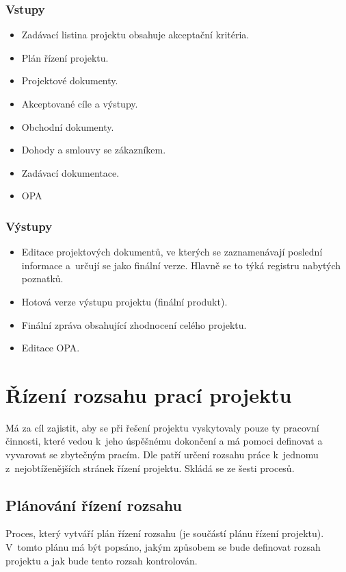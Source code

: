 \subsubsection*{Vstupy}
\begin{itemize}
    \item Zadávací listina projektu obsahuje akceptační kritéria.
    \item Plán řízení projektu.
    \item Projektové dokumenty.
    \item Akceptované cíle a výstupy.
    \item Obchodní dokumenty.
    \item Dohody a smlouvy se zákazníkem.
    \item Zadávací dokumentace.
    \item OPA
\end{itemize}
\subsubsection*{Výstupy}
\begin{itemize}
    \item Editace projektových dokumentů, ve kterých se zaznamenávají poslední informace a~určují se jako finální verze. Hlavně se to týká registru nabytých poznatků.
    \item Hotová verze výstupu projektu (finální produkt).
    \item Finální zpráva obsahující zhodnocení celého projektu.
    \item Editace OPA.
\end{itemize}

\section{Řízení rozsahu prací projektu}
\label{RizeniRozsahu}

Má za cíl zajistit, aby se při řešení projektu vyskytovaly pouze ty pracovní činnosti, které vedou k~jeho úspěšnému dokončení a má pomoci definovat a vyvarovat se zbytečným pracím. Dle \cite{StrategieRizeni} patří určení rozsahu práce k~jednomu z~nejobtíženějších stránek řízení projektu. Skládá se ze šesti procesů. 

\subsection*{Plánování řízení rozsahu}

Proces, který vytváří plán řízení rozsahu (je součástí plánu řízení projektu).  V~tomto plánu má být popsáno, jakým způsobem se bude definovat rozsah projektu a jak bude tento rozsah kontrolován.


